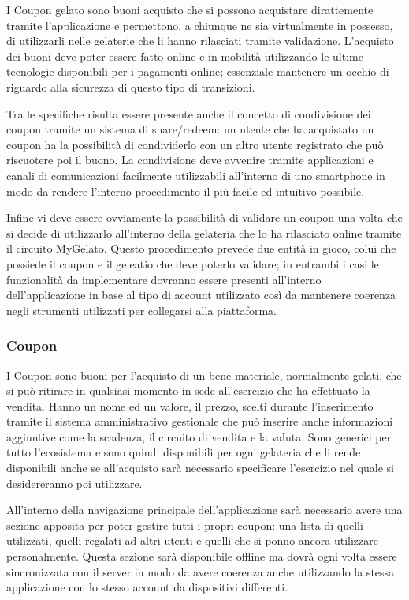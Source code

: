 I Coupon gelato sono buoni acquisto che si possono acquistare dirattemente tramite l'applicazione e permettono, a chiunque ne sia virtualmente in possesso, di utilizzarli nelle gelaterie che li hanno rilasciati tramite validazione.
L'acquisto dei buoni deve poter essere fatto online e in mobilità utilizzando le ultime tecnologie disponibili per i pagamenti online; essenziale mantenere un occhio di riguardo alla sicurezza di questo tipo di transizioni.

Tra le specifiche risulta essere presente anche il concetto di condivisione dei coupon tramite un sistema di share/redeem: un utente che ha acquistato un coupon ha la possibilità di condividerlo con un altro utente registrato che può riscuotere poi il buono. La condivisione deve avvenire tramite applicazioni e canali di comunicazioni facilmente utilizzabili all'interno di uno smartphone in modo da rendere l'interno procedimento il più facile ed intuitivo possibile.

Infine vi deve essere ovviamente la possibilità di validare un coupon una volta che si decide di utilizzarlo all'interno della gelateria che lo ha rilasciato online tramite il circuito MyGelato. Questo procedimento prevede due entità in gioco, colui che possiede il coupon e il geleatio che deve poterlo validare; in entrambi i casi le funzionalità da implementare dovranno essere presenti all'interno dell'applicazione in base al tipo di account utilizzato così da mantenere coerenza negli strumenti utilizzati per collegarsi alla piattaforma.

\subsubsection{Coupon}
I Coupon sono buoni per l'acquisto di un bene materiale, normalmente gelati, che si può ritirare in qualsiasi momento in sede all'esercizio che ha effettuato la vendita.
Hanno un nome ed un valore, il prezzo, scelti durante l'inserimento tramite il sistema amministrativo gestionale che può inserire anche informazioni aggiuntive come la scadenza, il circuito di vendita e la valuta.
Sono generici per tutto l'ecosistema e sono quindi disponibili per ogni gelateria che li rende disponibili anche se all'acquisto sarà necessario specificare l'esercizio nel quale si desidereranno poi utilizzare.

All'interno della navigazione principale dell'applicazione sarà necessario avere una sezione apposita per poter gestire tutti i propri coupon: una lista di quelli utilizzati, quelli regalati ad altri utenti e quelli che si ponno ancora utilizzare personalmente.
Questa sezione sarà disponibile offline ma dovrà ogni volta essere sincronizzata con il server in modo da avere coerenza anche utilizzando la stessa applicazione con lo stesso account da dispositivi differenti.

